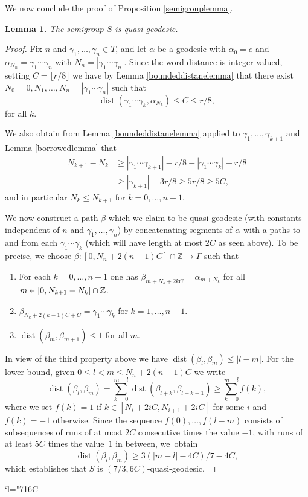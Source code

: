 \documentclass[JEP,XML,SOM,Unicode,NoEqCountersInSection,published]{cedram}
\newcommand{\Changelback}{\mathcode`l="716C}
\newtheorem{lemma}[theorem]{Lemma}
\newcommand{\Z}{\mathbb{Z}}
\DeclareMathOperator{\dist}{dist}
\begin{document}
We now conclude the proof of Proposition \ref{semigrouplemma}.

\begin{lemma}
The semigroup \(S\) is quasi-geodesic.
\end{lemma}
\begin{proof}
Fix \(n\) and \(\gamma_1,\ldots, \gamma_n \in T\), and let \(\alpha\) be a geodesic with \(\alpha_0 = e\) and \(\alpha_{N_n} = \gamma_1\cdots \gamma_n\) with \(N_n = |\gamma_1\cdots \gamma_n|\).
Since the word distance is integer valued, setting \(C = \lfloor r/8 \rfloor\) we have by Lemma \ref{boundeddistanelemma} that there exist \(N_0 = 0, N_1, \ldots,N_n = |\gamma_1\cdots \gamma_n|\) such that\vspace*{-3pt}
\[
\dist(\gamma_1\cdots \gamma_k, \alpha_{N_k}) \le C \le r/8,
\]
for all \(k\).

We also obtain from Lemma \ref{boundeddistanelemma} applied to \(\gamma_1,\ldots, \gamma_{k+1}\) and Lemma \ref{borrowedlemma} that
\begin{align*}
N_{k+1} - N_k &\ge |\gamma_1\cdots \gamma_{k+1}|-r/8 - |\gamma_1\cdots \gamma_k| -r/8
\\ &\ge |\gamma_{k+1}| - 3r/8 \ge 5r/8 \ge 5C,
\end{align*}
and in particular \(N_{k} \le N_{k+1}\) for \(k = 0,\ldots, n-1\).

We now construct a path \(\beta\) which we claim to be quasi-geodesic (with constants independent of \(n\) and \(\gamma_1,\ldots,\gamma_n\)) by concatenating segments of \(\alpha\) with a paths to and from each \(\gamma_1\cdots \gamma_k\) (which will have length at most \(2C\) as seen above).
To be precise, we choose \(\beta:[0,N_n + 2(n-1)C] \cap \Z \to \Gamma\) such that
\begin{enumerate}
\item For each \(k = 0,\ldots,n-1\) one has \(\beta_{m+N_k+2kC} = \alpha_{m+N_k}\) for all \(m \in [0,N_{k+1}-\nobreak N_k] \cap \Z\).
\item \(\beta_{N_k + 2(k-1)C + C} = \gamma_1\cdots \gamma_k\) for \(k = 1,\ldots, n-1\).
\item \(\dist(\beta_m, \beta_{m+1})\le 1\) for all \(m\).
\end{enumerate}
In view of the third property above we have
\(\dist(\beta_l,\beta_m) \le |l-m|\).
For the lower bound, given \(0 \le l < m \le N_n + 2(n-1)C\) we write
\[
\dist(\beta_l,\beta_m) = \sum_{k = 0}^{m-l}\dist(\beta_{l+k},\beta_{l+k+1}) \ge \sum_{k = 0}^{m-l}f(k),
\]
where we set \(f(k) = 1\) if \(k \in [N_i+2iC,N_{i+1}+2iC]\) for some \(i\) and \(f(k) = -1\) otherwise.
Since the sequence \(f(0),\ldots,f(l-m)\) consists of subsequences of runs of at most \(2C\) consecutive times the value \(-1\), with runs of at least \(5C\) times the value~\(1\) in between, we~obtain
\[
\dist(\beta_l,\beta_m) \ge 3(|m-l| - 4C)/7 - 4C,
\]
which establishes that \(S\) is \((7/3, 6C)\)-quasi-geodesic.
\end{proof}

\Changelback

\backmatter


\end{document}

